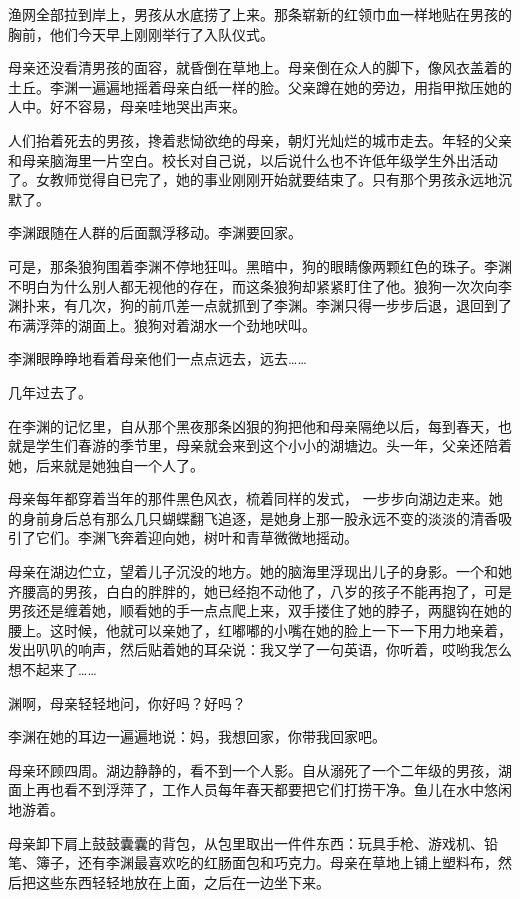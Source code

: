 \documentclass[UTF8]{ctexart}
\begin{document}
渔网全部拉到岸上，男孩从水底捞了上来。那条崭新的红领巾血一样地贴在男孩的胸前，他们今天早上刚刚举行了入队仪式。

母亲还没看清男孩的面容，就昏倒在草地上。母亲倒在众人的脚下，像风衣盖着的土丘。李渊一遍遍地摇着母亲白纸一样的脸。父亲蹲在她的旁边，用指甲揿压她的人中。好不容易，母亲哇地哭出声来。

人们抬着死去的男孩，搀着悲恸欲绝的母亲，朝灯光灿烂的城市走去。年轻的父亲和母亲脑海里一片空白。校长对自己说，以后说什么也不许低年级学生外出活动了。女教师觉得自已完了，她的事业刚刚开始就要结束了。只有那个男孩永远地沉默了。

李渊跟随在人群的后面飘浮移动。李渊要回家。

可是，那条狼狗围着李渊不停地狂叫。黑暗中，狗的眼睛像两颗红色的珠子。李渊不明白为什么别人都无视他的存在，而这条狼狗却紧紧盯住了他。狼狗一次次向李渊扑来，有几次，狗的前爪差一点就抓到了李渊。李渊只得一步步后退，退回到了布满浮萍的湖面上。狼狗对着湖水一个劲地吠叫。

李渊眼睁睁地看着母亲他们一点点远去，远去\ldots\ldots{}

几年过去了。

在李渊的记忆里，自从那个黑夜那条凶狠的狗把他和母亲隔绝以后，每到春天，也就是学生们春游的季节里，母亲就会来到这个小小的湖塘边。头一年，父亲还陪着她，后来就是她独自一个人了。

母亲每年都穿着当年的那件黑色风衣，梳着同样的发式，
一步步向湖边走来。她的身前身后总有那么几只蝴蝶翻飞追逐，是她身上那一股永远不变的淡淡的清香吸引了它们。李渊飞奔着迎向她，树叶和青草微微地摇动。

母亲在湖边伫立，望着儿子沉没的地方。她的脑海里浮现出儿子的身影。一个和她齐腰高的男孩，白白的胖胖的，她已经抱不动他了，八岁的孩子不能再抱了，可是男孩还是缠着她，顺看她的手一点点爬上来，双手搂住了她的脖子，两腿钩在她的腰上。这时候，他就可以亲她了，红嘟嘟的小嘴在她的脸上一下一下用力地亲着，发出叭叭的响声，然后贴着她的耳朵说：我又学了一句英语，你听着，哎哟我怎么想不起来了\ldots\ldots{}

渊啊，母亲轻轻地问，你好吗？好吗？

李渊在她的耳边一遍遍地说：妈，我想回家，你带我回家吧。

母亲环顾四周。湖边静静的，看不到一个人影。自从溺死了一个二年级的男孩，湖面上再也看不到浮萍了，工作人员每年春天都要把它们打捞干净。鱼儿在水中悠闲地游着。

母亲卸下肩上鼓鼓囊囊的背包，从包里取出一件件东西：玩具手枪、游戏机、铅笔、簿子，还有李渊最喜欢吃的红肠面包和巧克力。母亲在草地上铺上塑料布，然后把这些东西轻轻地放在上面，之后在一边坐下来。
\end{document}
